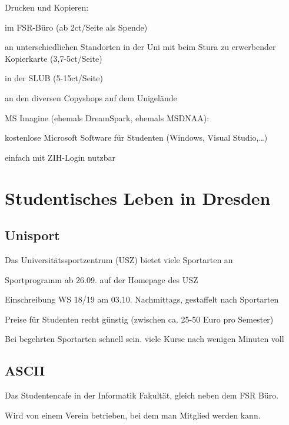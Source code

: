 \documentclass[a4paper,12pt]{report}
\begin{document}
\begin{itemize*}
\begin{itemize*}
    \end{itemize*}
    \item Drucken und Kopieren:
    \begin{itemize*}
        \item im FSR-Büro (ab 2ct/Seite als Spende)
        \item an unterschiedlichen Standorten in der Uni mit beim Stura zu erwerbender Kopierkarte (3,7-5ct/Seite)
        \item in der SLUB (5-15ct/Seite)
        \item an den diversen Copyshops auf dem Unigelände
    \end{itemize*}
    \item MS Imagine (ehemals DreamSpark, ehemals MSDNAA):
    \begin{itemize*}
        \item kostenlose Microsoft Software für Studenten (Windows, Visual Studio,\dots)
        \item einfach mit ZIH-Login nutzbar
    \end{itemize*}
\end{itemize*}

\section{Studentisches Leben in Dresden}

\subsection{Unisport}
Das Universitätssportzentrum (USZ) bietet viele Sportarten an
\begin{itemize*}
\item Sportprogramm ab 26.09. auf der Homepage des USZ
\item Einschreibung WS 18/19 am 03.10. Nachmittags, gestaffelt nach Sportarten
\item Preise für Studenten recht günstig (zwischen ca. 25-50 Euro pro Semester)
\item Bei begehrten Sportarten schnell sein. viele Kurse nach wenigen Minuten voll
\end{itemize*}

\subsection{ASCII}
\begin{itemize*}
\item Das Studentencafe in der Informatik Fakultät, gleich neben dem FSR Büro.
\item Wird von einem Verein betrieben, bei dem man Mitglied werden kann.
\end{itemize*}
\end{document}
